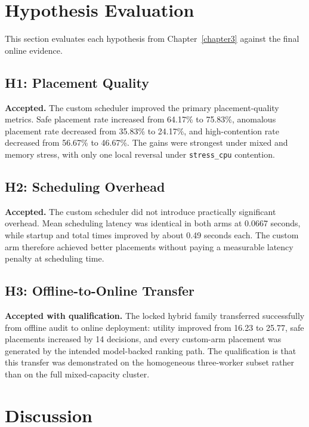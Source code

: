 \section{Hypothesis Evaluation}
\label{sec:hypothesis-eval}

This section evaluates each hypothesis from Chapter~\ref{chapter3} against the final online evidence.

\subsection{H1: Placement Quality}

\textbf{Accepted.} The custom scheduler improved the primary placement-quality metrics. Safe placement rate increased from 64.17\% to 75.83\%, anomalous placement rate decreased from 35.83\% to 24.17\%, and high-contention rate decreased from 56.67\% to 46.67\%. The gains were strongest under mixed and memory stress, with only one local reversal under \texttt{stress\_cpu} contention.


\subsection{H2: Scheduling Overhead}

\textbf{Accepted.} The custom scheduler did not introduce practically significant overhead. Mean scheduling latency was identical in both arms at 0.0667 seconds, while startup and total times improved by about 0.49 seconds each. The custom arm therefore achieved better placements without paying a measurable latency penalty at scheduling time.


\subsection{H3: Offline-to-Online Transfer}

\textbf{Accepted with qualification.} The locked hybrid family transferred successfully from offline audit to online deployment: utility improved from 16.23 to 25.77, safe placements increased by 14 decisions, and every custom-arm placement was generated by the intended model-backed ranking path. The qualification is that this transfer was demonstrated on the homogeneous three-worker subset rather than on the full mixed-capacity cluster.


\section{Discussion}
\label{sec:discussion}

